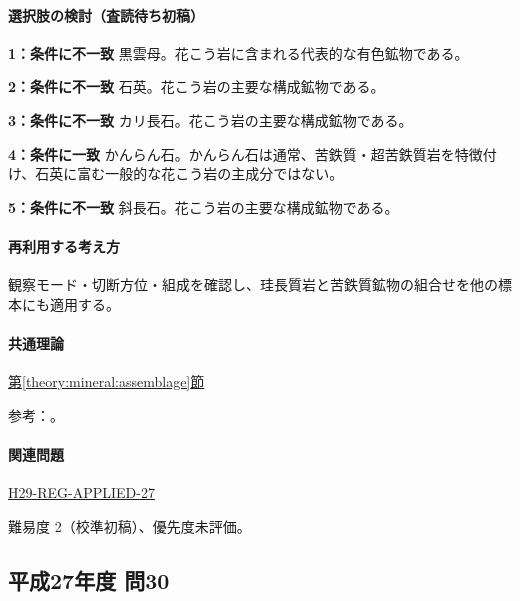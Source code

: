 \paragraph{選択肢の検討（査読待ち初稿）}\mbox{}\par

\noindent\textbf{1：条件に不一致} 黒雲母。花こう岩に含まれる代表的な有色鉱物である。\par

\noindent\textbf{2：条件に不一致} 石英。花こう岩の主要な構成鉱物である。\par

\noindent\textbf{3：条件に不一致} カリ長石。花こう岩の主要な構成鉱物である。\par

\noindent\textbf{4：条件に一致} かんらん石。かんらん石は通常、苦鉄質・超苦鉄質岩を特徴付け、石英に富む一般的な花こう岩の主成分ではない。\par

\noindent\textbf{5：条件に不一致} 斜長石。花こう岩の主要な構成鉱物である。\par

\paragraph{再利用する考え方} 観察モード・切断方位・組成を確認し、珪長質岩と苦鉄質鉱物の組合せを他の標本にも適用する。

\paragraph{共通理論} \hyperref[theory:mineral:assemblage]{第\ref*{theory:mineral:assemblage}節}

\par 参考：\cite{usgs_igneous_components,hom_forsterite}。

\paragraph{関連問題} \hyperref[q:h29-reg-applied-27]{H29-REG-APPLIED-27}

\par 難易度 2（校準初稿）、優先度未評価。

\subsection{平成27年度 問30}
\label{q:h27-reg-applied-30}

